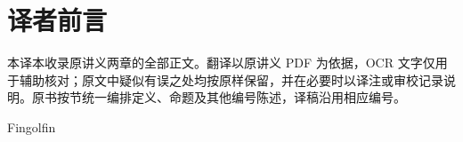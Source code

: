 \documentclass[BookTitleCN={Lie 群与 Lie 代数},OriginalAuthor={Jean-François Dat},OriginalYear={2012-2013},Translator={Fingolfin},TranslationDate={2026年10月24日},ModelUsed={ZCode},BibStyle=numeric]{mathtranslation}
\begin{document}
\hypersetup{pageanchor=false}
\makecover
\cleardoublepage
\hypersetup{pageanchor=true}
\frontmatter
\chapter*{译者前言}
本译本收录原讲义两章的全部正文。翻译以原讲义 PDF 为依据，OCR 文字仅用于辅助核对；原文中疑似有误之处均按原样保留，并在必要时以译注或审校记录说明。原书按节统一编排定义、命题及其他编号陈述，译稿沿用相应编号。
\par\medskip\hfill Fingolfin
\makecontents
\mainmatter



















\backmatter
\printterminology
\end{document}
